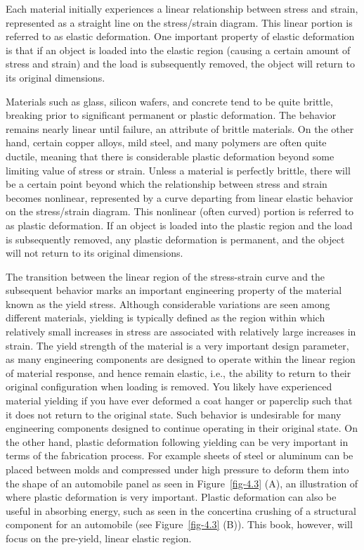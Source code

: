 \documentclass[
  letterpaper,
  DIV=11,
  numbers=noendperiod]{scrreprt}
\theoremstyle{definition}
\theoremstyle{remark}
\begin{document}
Each material initially experiences a linear relationship between stress
and strain, represented as a straight line on the stress/strain diagram.
This linear portion is referred to as elastic deformation. One important
property of elastic deformation is that if an object is loaded into the
elastic region (causing a certain amount of stress and strain) and the
load is subsequently removed, the object will return to its original
dimensions.

Materials such as glass, silicon wafers, and concrete tend to be quite
brittle, breaking prior to significant permanent or plastic deformation.
The behavior remains nearly linear until failure, an attribute of
brittle materials. On the other hand, certain copper alloys, mild steel,
and many polymers are often quite ductile, meaning that there is
considerable plastic deformation beyond some limiting value of stress or
strain. Unless a material is perfectly brittle, there will be a certain
point beyond which the relationship between stress and strain becomes
nonlinear, represented by a curve departing from linear elastic behavior
on the stress/strain diagram. This nonlinear (often curved) portion is
referred to as plastic deformation. If an object is loaded into the
plastic region and the load is subsequently removed, any plastic
deformation is permanent, and the object will not return to its original
dimensions.

The transition between the linear region of the stress-strain curve and
the subsequent behavior marks an important engineering property of the
material known as the yield stress. Although considerable variations are
seen among different materials, yielding is typically defined as the
region within which relatively small increases in stress are associated
with relatively large increases in strain. The yield strength of the
material is a very important design parameter, as many engineering
components are designed to operate within the linear region of material
response, and hence remain elastic, i.e., the ability to return to their
original configuration when loading is removed. You likely have
experienced material yielding if you have ever deformed a coat hanger or
paperclip such that it does not return to the original state. Such
behavior is undesirable for many engineering components designed to
continue operating in their original state. On the other hand, plastic
deformation following yielding can be very important in terms of the
fabrication process. For example sheets of steel or aluminum can be
placed between molds and compressed under high pressure to deform them
into the shape of an automobile panel as seen in Figure~\ref{fig-4.3}
(A), an illustration of where plastic deformation is very important.
Plastic deformation can also be useful in absorbing energy, such as seen
in the concertina crushing of a structural component for an automobile
(see Figure~\ref{fig-4.3} (B)). This book, however, will focus on the
pre-yield, linear elastic region.
\end{document}

